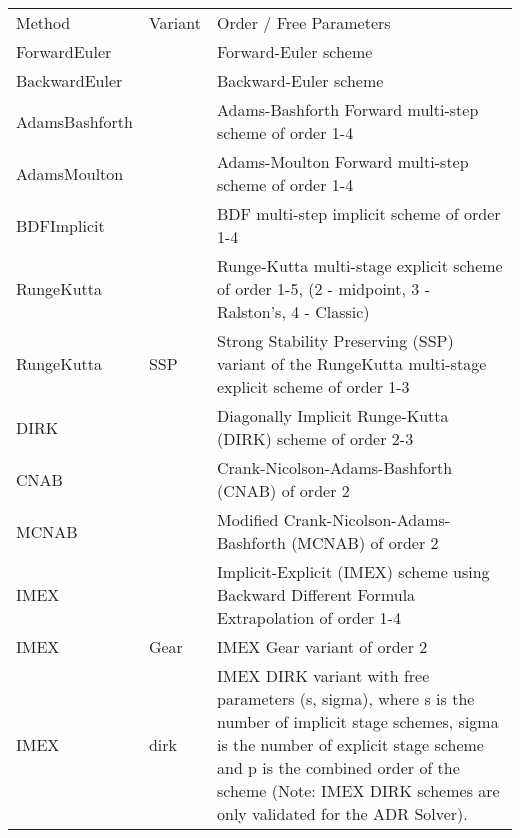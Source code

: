 \begin{center}
\footnotesize
\begin{tabular}{p{2.5cm}p{1cm}p{10cm}}
\toprule
Method         & Variant & Order / Free Parameters \\
ForwardEuler   &      & Forward-Euler scheme\\
BackwardEuler  &      & Backward-Euler scheme\\

AdamsBashforth &      & Adams-Bashforth Forward multi-step scheme of order 1-4\\

AdamsMoulton   &      & Adams-Moulton Forward multi-step scheme of order 1-4\\

BDFImplicit    &      & BDF multi-step implicit scheme of order 1-4\\

RungeKutta     &      & Runge-Kutta multi-stage explicit scheme of
                        order 1-5, (2 - midpoint, 3 - Ralston's, 4 - Classic)\\

RungeKutta     & SSP  & Strong Stability Preserving (SSP) variant of
                        the RungeKutta multi-stage explicit scheme of
                        order 1-3\\

DIRK           &      & Diagonally Implicit Runge-Kutta (DIRK) scheme of
                        order 2-3\\

CNAB           &      & Crank-Nicolson-Adams-Bashforth (CNAB) of order 2\\

MCNAB          &      & Modified Crank-Nicolson-Adams-Bashforth (MCNAB)
                        of order 2\\

IMEX           &      & Implicit-Explicit (IMEX) scheme using Backward
                        Different Formula Extrapolation of order 1-4\\

IMEX           & Gear & IMEX Gear variant of order 2\\

IMEX           & dirk & IMEX DIRK variant with free parameters (s, sigma), 
                        where s is the number of implicit stage schemes,
                        sigma is the number of explicit stage scheme and
                        p is the combined order of the scheme (Note: IMEX 
                        DIRK schemes are only validated for the ADR Solver).\\


\end{tabular}
\end{center}
